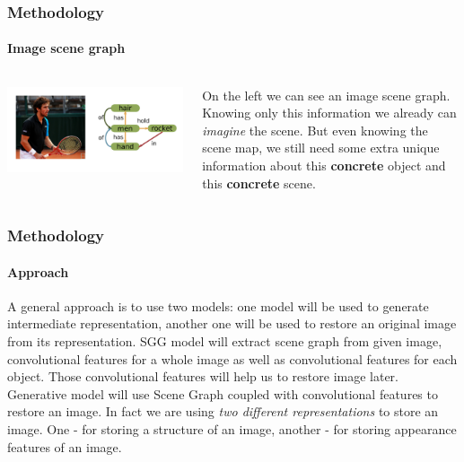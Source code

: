 \documentclass[10pt]{beamer}
\begin{document}
\begin{frame}
    \frametitle{Methodology}
    \framesubtitle{Image scene graph}
    \begin{columns}
        \begin{column}{0.5\textwidth}
            \includegraphics[width=\textwidth]{figure/image-and-scene-graph.png}
        \end{column}
        \begin{column}{0.5\textwidth}
            On the left we can see an image scene graph. Knowing only this information we already can \textit{imagine} the scene. But even knowing the scene map, we still need some extra unique information about this \textbf{concrete} object and this \textbf{concrete} scene.
        \end{column}
    \end{columns}
\end{frame}

\begin{frame}
    \frametitle{Methodology}
    \framesubtitle{Approach}
    A general approach is to use two models: one model will be used to generate intermediate representation, another one will be used to restore an original image from its representation.
    \vspace{5pt}
    SGG model will extract scene graph from given image, convolutional features for a whole image as well as convolutional features for each object. Those convolutional features will help us to restore image later.
    \vspace{5pt}
    Generative model will use Scene Graph coupled with convolutional features to restore an image.
    \vspace{5pt}
    In fact we are using \textit{two different representations} to store an image. One - for storing a structure of an image, another - for storing appearance features of an image.

\end{frame}
\end{document}
